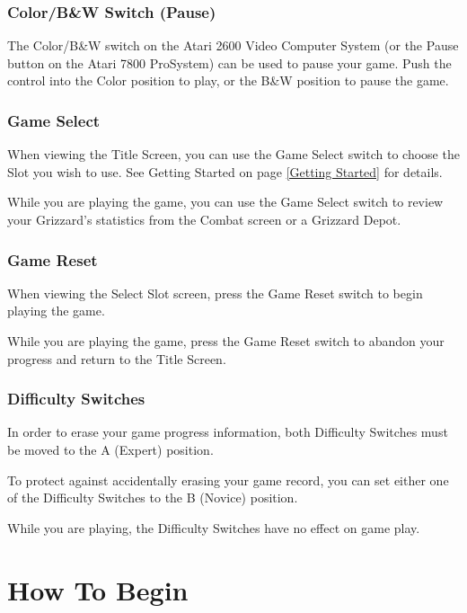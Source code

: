 \documentclass[12pt,twoside,openright,book]{memoir}
\begin{document}
\subsection{Color/B\&W Switch (Pause)}

The Color/B\&W  switch on the Atari  2600 Video Computer System  (or the
Pause button  on the  Atari 7800  ProSystem) can be  used to  pause your
game. Push  the control  into the  Color position to  play, or  the B\&W
position to pause the game.

\endif

\subsection{Game Select}

When viewing  the Title Screen,  you can use  the Game Select  switch to
choose  the  Slot  you  wish  to   use.  See  Getting  Started  on  page
\ref{Getting Started} for details.

While you are  playing the game, you  can use the Game  Select switch to
review   your  Grizzard's   statistics   from  the   Combat  screen   or
a Grizzard Depot.

\subsection{Game Reset}

When viewing  the Select  Slot screen,  press the  Game Reset  switch to
begin playing the game.

While you are  playing the game, press the Game  Reset switch to abandon
your progress and return to the Title Screen.

\subsection{Difficulty Switches}

In  order  to erase  your  game  progress information,  both  Difficulty
Switches must be moved to the A (Expert) position.

To protect  against accidentally erasing  your game record, you  can set
either one of the Difficulty Switches to the B (Novice) position.

While  you  are playing,  the  Difficulty  Switches  have no  effect  on
game play.

\chapter{How To Begin}\label{How To Begin}
\end{document}

